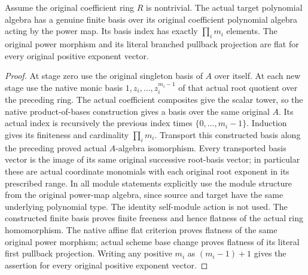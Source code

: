 \begin{lemma}
\label{lem:kn-nadel-kummer-power-map-basis}
\leanok
{}
Assume the original coefficient ring $R$ is nontrivial.  The actual
target polynomial algebra has a genuine finite basis over its
original coefficient polynomial algebra acting by the power map.
Its basis index has exactly $\prod_i m_i$ elements.  The original
power morphism and its literal branched pullback projection are
flat for every original positive exponent vector.
\end{lemma}
\begin{proof}
At stage zero use the original singleton basis of $A$ over itself.
At each new stage use the native monic basis
$1,z_i,\ldots,z_i^{m_i-1}$ of that actual root quotient over the
preceding ring.  The actual coefficient composites give the scalar
tower, so the native product-of-bases construction gives a basis
over the same original $A$.  Its actual index is recursively the
previous index times $\{0,\ldots,m_i-1\}$.  Induction gives its
finiteness and cardinality $\prod_i m_i$.
Transport this constructed basis along the preceding proved actual
$A$-algebra isomorphism.  Every transported basis vector is the
image of its same original successive root-basis vector; in
particular these are actual coordinate monomials with each
original root exponent in its prescribed range.  In all module
statements explicitly use the module structure from the original
power-map algebra, since source and target have the same underlying
polynomial type.  The identity self-module action is not used.
The constructed finite basis proves finite freeness and hence
flatness of the actual ring homomorphism.  The native affine flat
criterion proves flatness of the same original power morphism;
actual scheme base change proves flatness of its literal first
pullback projection.  Writing any positive $m_i$ as $(m_i-1)+1$
gives the assertion for every original positive exponent vector.
\end{proof}
